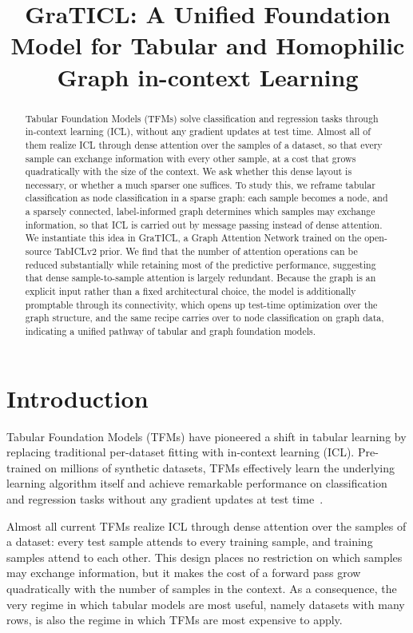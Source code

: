 \documentclass{article} %
\title{GraTICL: A Unified Foundation Model for Tabular and Homophilic Graph in-context Learning}
\author{}
\begin{document}
\maketitle

\begin{abstract}
Tabular Foundation Models (TFMs) solve classification and regression tasks through in-context learning (ICL), without any gradient updates at test time. Almost all of them realize ICL through dense attention over the samples of a dataset, so that every sample can exchange information with every other sample, at a cost that grows quadratically with the size of the context. We ask whether this dense layout is necessary, or whether a much sparser one suffices. To study this, we reframe tabular classification as node classification in a sparse graph: each sample becomes a node, and a sparsely connected, label-informed graph determines which samples may exchange information, so that ICL is carried out by message passing instead of dense attention. We instantiate this idea in GraTICL, a Graph Attention Network trained on the open-source TabICLv2 prior. We find that the number of attention operations can be reduced substantially while retaining most of the predictive performance, suggesting that dense sample-to-sample attention is largely redundant. Because the graph is an explicit input rather than a fixed architectural choice, the model is additionally promptable through its connectivity, which opens up test-time optimization over the graph structure, and the same recipe carries over to node classification on graph data, indicating a unified pathway of tabular and graph foundation models.
\end{abstract}

\section{Introduction}

Tabular Foundation Models (TFMs) have pioneered a shift in tabular learning by replacing traditional per-dataset fitting with in-context learning (ICL). Pre-trained on millions of synthetic datasets, TFMs effectively learn the underlying learning algorithm itself and achieve remarkable performance on classification and regression tasks without any gradient updates at test time~\citep{hollmann2025accurate, qu2026tabiclv2, zhang2025limixunleashingstructureddatamodeling, zhang2025mitra}.

Almost all current TFMs realize ICL through dense attention over the samples of a dataset: every test sample attends to every training sample, and training samples attend to each other. This design places no restriction on which samples may exchange information, but it makes the cost of a forward pass grow quadratically with the number of samples in the context. As a consequence, the very regime in which tabular models are most useful, namely datasets with many rows, is also the regime in which TFMs are most expensive to apply.
\end{document}
